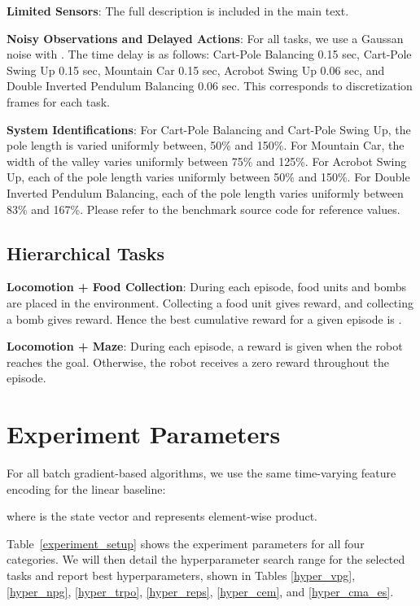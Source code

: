 \documentclass{article}
\begin{document}
{\bf Limited Sensors}: The full description is included in the main text.

{\bf Noisy Observations and Delayed Actions}: For all tasks, we use a Gaussan noise with . The time delay is as follows: Cart-Pole Balancing 0.15 sec, Cart-Pole Swing Up 0.15 sec, Mountain Car 0.15 sec, Acrobot Swing Up 0.06 sec, and Double Inverted Pendulum Balancing 0.06 sec. This corresponds to  discretization frames for each task.

{\bf System Identifications}: For Cart-Pole Balancing and Cart-Pole Swing Up, the pole length is varied uniformly between, 50\% and 150\%. For Mountain Car, the width of the valley varies uniformly between 75\% and 125\%. For Acrobot Swing Up, each of the pole length varies uniformly between 50\% and 150\%. For Double Inverted Pendulum Balancing, each of the pole length varies uniformly between 83\% and 167\%. Please refer to the benchmark source code for reference values.

\subsection{Hierarchical Tasks}

{\bf Locomotion + Food Collection}: During each episode,  food units and  bombs are placed in the environment. Collecting a food unit gives  reward, and collecting a bomb gives  reward. Hence the best cumulative reward for a given episode is .

{\bf Locomotion + Maze}: During each episode, a  reward is given when the robot reaches the goal. Otherwise, the robot receives a zero reward throughout the episode. 

\section{Experiment Parameters}

For all batch gradient-based algorithms, we use the same time-varying feature encoding for the linear baseline:

where  is the state vector and  represents element-wise product.

Table~\ref{experiment_setup} shows the experiment parameters for all four categories. We will then detail the hyperparameter search range for the selected tasks and report best hyperparameters, shown in Tables \ref{hyper_vpg}, \ref{hyper_npg}, \ref{hyper_trpo}, \ref{hyper_reps}, \ref{hyper_cem}, and \ref{hyper_cma_es}.
\end{document}
